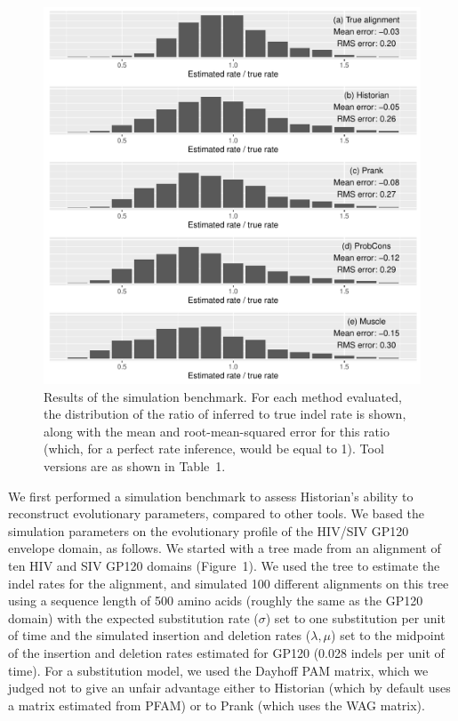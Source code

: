 \documentclass{bioinfo}
\begin{document}
\begin{figure}
  \includegraphics[width=\columnwidth]{sim/results.pdf}
  \caption{
    Results of the simulation benchmark.
    For each method evaluated, the distribution of the ratio of inferred to true
    indel rate is shown, along with the mean and root-mean-squared error for this
    ratio (which, for a perfect rate inference, would be equal to 1).
    Tool versions are as shown in Table~1.
  }
\end{figure}

We first performed a simulation benchmark to assess Historian's ability to reconstruct evolutionary parameters,
compared to other tools.
We based the simulation parameters on the evolutionary profile of the HIV/SIV GP120 envelope domain, as follows.
We started with a tree made from an alignment of ten HIV and SIV GP120 domains (Figure~1).
We used the tree to estimate the indel rates for the alignment,
and simulated 100 different alignments on this tree
using a sequence length of 500 amino acids
(roughly the same as the GP120 domain)
with the expected substitution rate ($\sigma$) set to one substitution per unit of time
and the simulated insertion and deletion rates ($\lambda,\mu$)
set to the midpoint of the insertion and deletion rates
estimated for GP120 (0.028 indels per unit of time).
For a substitution model, we used the Dayhoff PAM matrix,
which we judged not to give an unfair advantage either to Historian
(which by default uses a matrix estimated from PFAM)
or to Prank (which uses the WAG matrix).
\end{document}

